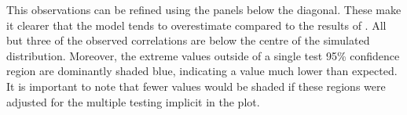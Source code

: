 \documentclass{article}
\newcommand{\ve}[1]{\mathbf{#1}}           %
\newcommand{\m}[1]{\mathbf{#1}}               %
\begin{document}
This observations can be refined using the panels below the diagonal. These make it clearer that the model tends to overestimate compared to the results of \cite{cheverud2001}. All but three of the observed correlations are below the centre of the simulated distribution. Moreover, the extreme values outside of a single test 95\% confidence region are dominantly shaded blue, indicating a value much lower than expected. It is important to note that fewer values would be shaded if these regions were adjusted for the multiple testing implicit in the plot.






\end{document}
